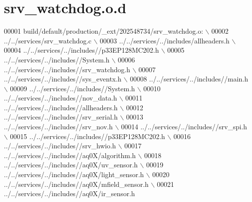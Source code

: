 \hypertarget{a00068_source}{\section{srv\+\_\+watchdog.\+o.\+d}
\label{a00068_source}
}

\begin{DoxyCode}
00001 build/\textcolor{keywordflow}{default}/production/\_ext/202548734/srv\_watchdog.o:  \(\backslash\)
00002  ../../services/srv\_watchdog.c  \(\backslash\)
00003 ../../services/../includes/allheaders.h  \(\backslash\)
00004 ../../services/../includes\textcolor{comment}{//p33EP128MC202.h  \(\backslash\)}
00005 \textcolor{comment}{../../services/../includes//System.h  \(\backslash\)}
00006 \textcolor{comment}{../../services/../includes//srv\_watchdog.h  \(\backslash\)}
00007 \textcolor{comment}{../../services/../includes//sys\_eventx.h  \(\backslash\)}
00008 \textcolor{comment}{../../services/../includes//main.h  \(\backslash\)}
00009 \textcolor{comment}{../../services/../includes//System.h  \(\backslash\)}
00010 \textcolor{comment}{../../services/../includes//nov\_data.h  \(\backslash\)}
00011 \textcolor{comment}{../../services/../includes//allheaders.h  \(\backslash\)}
00012 \textcolor{comment}{../../services/../includes//srv\_serial.h  \(\backslash\)}
00013 \textcolor{comment}{../../services/../includes//srv\_nov.h  \(\backslash\)}
00014 \textcolor{comment}{../../services/../includes//srv\_spi.h  \(\backslash\)}
00015 \textcolor{comment}{../../services/../includes//p33EP128MC202.h  \(\backslash\)}
00016 \textcolor{comment}{../../services/../includes//srv\_hwio.h  \(\backslash\)}
00017 \textcolor{comment}{../../services/../includes//aq0X/algorithm.h  \(\backslash\)}
00018 \textcolor{comment}{../../services/../includes//aq0X/uv\_sensor.h  \(\backslash\)}
00019 \textcolor{comment}{../../services/../includes//aq0X/light\_sensor.h  \(\backslash\)}
00020 \textcolor{comment}{../../services/../includes//aq0X/mfield\_sensor.h  \(\backslash\)}
00021 \textcolor{comment}{../../services/../includes//aq0X/ir\_sensor.h }
\end{DoxyCode}
